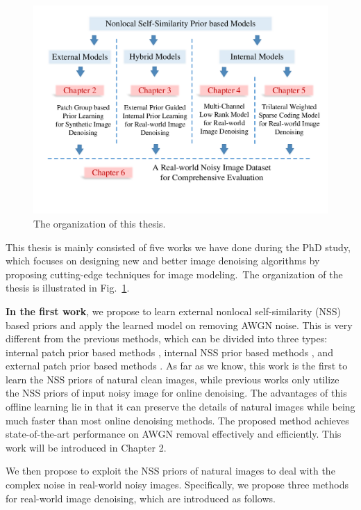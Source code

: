 \begin{figure}[t!]
\centering
\includegraphics[width=1\linewidth]{images/ThesisOrganization.pdf}
\vspace{-20mm}
\caption{The organization of this thesis.}
\label{fig1-1}
\end{figure}

This thesis is mainly consisted of five works we have done during the PhD study, which focuses on designing new and better image denoising algorithms by proposing cutting-edge techniques for image modeling.\ The organization of the thesis is illustrated in Fig.\ \ref{fig1-1}.

\textbf{In the first work}, we propose to learn external nonlocal self-similarity (NSS) based priors and apply the learned model on removing AWGN noise. This is very different from the previous methods, which can be divided into three types: internal patch prior based methods \cite{ksvd,ple}, internal NSS prior based methods \cite{bm3d,lssc,ncsr,wnnm}, and external patch prior based methods \cite{epll}. As far as we know, this work is the first to learn the NSS priors of natural clean images, while previous works only utilize the NSS priors of input noisy image for online denoising. The advantages of this offline learning lie in that it can preserve the details of natural images while being much faster than most online denoising methods. The proposed method achieves state-of-the-art performance on AWGN removal effectively and efficiently. This work will be introduced in Chapter 2.

We then propose to exploit the NSS priors of natural images to deal with the complex noise in real-world noisy images. Specifically, we propose three methods for real-world image denoising, which are introduced as follows.

